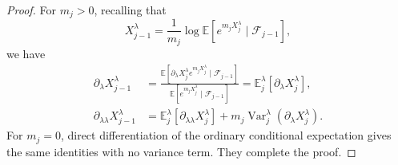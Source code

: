 \documentclass[11pt]{article}
\numberwithin{equation}{section}
\newcommand{\E}{\mathbb{E}}
\newcommand{\1}{\mathbf 1}
\begin{document}
\begin{proof}
For $m_j>0$, recalling that $$ X_{j-1}^\lambda= \displaystyle\frac1{m_j}\log\E\left[
 e^{m_jX_j^\lambda}\mid\mathcal F_{j-1}\right],$$
 we have 
\begin{align*}
 \partial_\lambda X_{j-1}^\lambda
 &=\frac{
\E\left[
\partial_\lambda X_j^\lambda e^{m_jX_j^\lambda}\mid\mathcal F_{j-1}
\right]
}{
\E\left[
e^{m_jX_j^\lambda}\mid\mathcal F_{j-1}
\right]}
= \E_j^\lambda[\partial_\lambda X_j^\lambda],\\
 \partial_{\lambda\lambda}X_{j-1}^\lambda
 &=\E_j^\lambda[\partial_{\lambda\lambda}X_j^\lambda]
   +m_j\operatorname{Var}_j^\lambda
       (\partial_\lambda X_j^\lambda).
\end{align*}
For $m_j=0$, direct differentiation of the ordinary conditional
expectation gives the same identities with no variance term.  They complete the proof. 
\end{proof}
\end{document}
